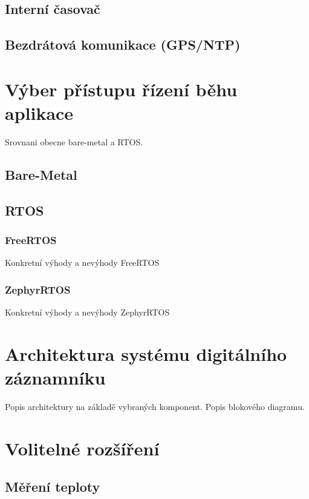 \subsection{Interní časovač}

\subsection{Bezdrátová komunikace (GPS/NTP)}

\section{Výber přístupu řízení běhu aplikace}
Srovnani obecne bare-metal a RTOS.


\subsection{Bare-Metal}

\subsection{RTOS}
\subsubsection{FreeRTOS}
Konkretní výhody a nevýhody FreeRTOS

\subsubsection{ZephyrRTOS}
Konkretní výhody a nevýhody ZephyrRTOS


\section{Architektura systému digitálního záznamníku}
Popis architektury na základě vybraných komponent. Popis blokového diagramu.


\section{Volitelné rozšíření}
\subsection{Měření teploty}

